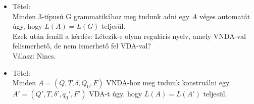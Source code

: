 \documentclass[margin=0px]{article}
\begin{document}
\begin{description}
\begin{itemize}
						\item Tétel: \\
							Minden 3-típusú G grammatikához meg tudunk adni egy $A$ véges automatát úgy, hogy $L(A) = L(G)$ teljesül. \\
						
						
							Ezek után fenáll a kérdés: Létezik-e olyan reguláris nyelv, amely VNDA-val felismerhető, de nem ismerhető fel VDA-val? \\
							Válasz: Nincs.
						
						\item Tétel:\\
							Minden $A = (Q, T, \delta,Q_0, F)$ VNDA-hoz  meg tudunk konstruálni egy $A' = (Q', T, \delta', q_0', F')$ VDA-t úgy, hogy $L(A) = L(A')$ teljesül.
				\end{itemize}
			\end{description}
\end{document}
